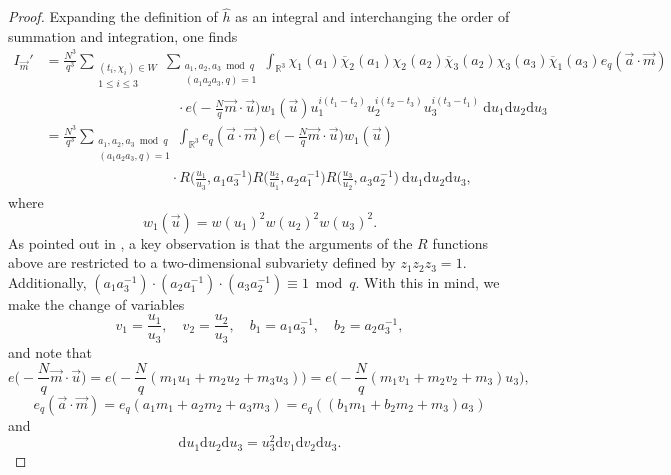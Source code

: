 \documentclass[12pt]{amsart}
\theoremstyle{definition}
\theoremstyle{plain}
\theoremstyle{remark}
\numberwithin{equation}{section}
\numberwithin{theorem}{section}
\numberwithin{equation}{section}
\begin{document}
	\begin{proof}
		Expanding the definition of $\hat{h}$ as an integral and interchanging the order of summation and integration, one finds 
		\begin{align*}
			I_{\overrightarrow{m}}'&=\frac{N^{3}}{q^{3}}\sum_{\substack{(t_{i}, \chi_{i})\in W \\ 1\leq i \leq 3}}\sum_{\substack{a_1,a_2,a_3 \bmod q \\ (a_1a_2a_3,q)=1}}\int_{\mathbb{R}^{3}}\chi_{1}(a_{1})\overline{\chi}_{2}(a_{1})
			\chi_{2}(a_{2})\overline{\chi}_{3}(a_{2})
			\chi_{3}(a_{3})\overline{\chi}_{1}(a_{3})e_q(\overrightarrow{a}\cdot\overrightarrow{m})
			\\
			&\quad \quad \quad \quad \quad \quad\quad \quad \quad \ \ \cdot e\bigg(-\frac{N}{q}\overrightarrow{m}\cdot\overrightarrow{u}\bigg)w_{1}(\overrightarrow{u})u_{1}^{i(t_{1}-t_{2})}u_{2}^{i(t_{2}-t_{3})}u_{3}^{i(t_{3}-t_{1})}\:\mathrm{d}u_{1}\mathrm{d}u_{2}\mathrm{d}u_{3}
			\\
			&=\frac{N^{3}}{q^{3}}\sum_{\substack{a_1,a_2,a_3 \bmod q \\ (a_1a_2a_3,q)=1}}\int_{\mathbb{R}^{3}}e_q(\overrightarrow{a}\cdot\overrightarrow{m})
			e\bigg(-\frac{N}{q}\overrightarrow{m}\cdot\overrightarrow{u}\bigg)w_{1}(\overrightarrow{u})
			\\
			&\quad \quad \quad\quad \quad \quad\quad \quad \quad\cdot R\bigg(\frac{u_{1}}{u_{3}}, a_{1}a_{3}^{-1}\bigg)R\bigg(\frac{u_{2}}{u_{1}}, a_{2}a_{1}^{-1}\bigg)R\bigg(\frac{u_{3}}{u_{2}}, a_{3}a_{2}^{-1}\bigg)\:\mathrm{d}u_{1}\mathrm{d}u_{2}\mathrm{d}u_{3},
		\end{align*}
		where
		\[w_{1}(\overrightarrow{u})=w(u_{1})^{2}w(u_{2})^{2}w(u_{3})^{2}.\]
		As pointed out in \cite[p. 21]{GM}, a key observation is that the arguments of the $R$ functions above are restricted to a two-dimensional subvariety defined by $z_{1}z_{2}z_{3}=1$. Additionally, $(a_{1}a_{3}^{-1})\cdot(a_{2}a_{1}^{-1})\cdot(a_{3}a_{2}^{-1})\equiv 1 \bmod q$. With this in mind, we make the change of variables
		\[v_{1}=\frac{u_{1}}{u_{3}}, \quad v_{2}=\frac{u_{2}}{u_{3}}, \quad 
		b_{1}=a_{1}a_{3}^{-1}, \quad
		b_{2}=a_{2}a_{3}^{-1},\]
		and note that
		\[e\bigg(-\frac{N}{q}\overrightarrow{m}\cdot\overrightarrow{u}\bigg)=e\bigg(-\frac{N}{q}(m_{1}u_{1}+m_{2}u_{2}+m_{3}u_{3})\bigg)=e\bigg(-\frac{N}{q}(m_{1}v_{1}+m_{2}v_{2}+m_{3})u_{3}\bigg),\]
		\[e_q(\overrightarrow{a}\cdot\overrightarrow{m})=e_q({a_{1}m_{1}+a_{2}m_{2}+a_{3}m_{3}})=e_q({(b_{1}m_{1}+b_{2}m_{2}+m_{3})a_{3}})\]
		and
		\[\mathrm{d}u_{1}\mathrm{d}u_{2}\mathrm{d}u_{3}=u_{3}^{2}\mathrm{d}v_{1}\mathrm{d}v_{2}\mathrm{d}u_{3}.\]

\end{proof}
\end{document}
